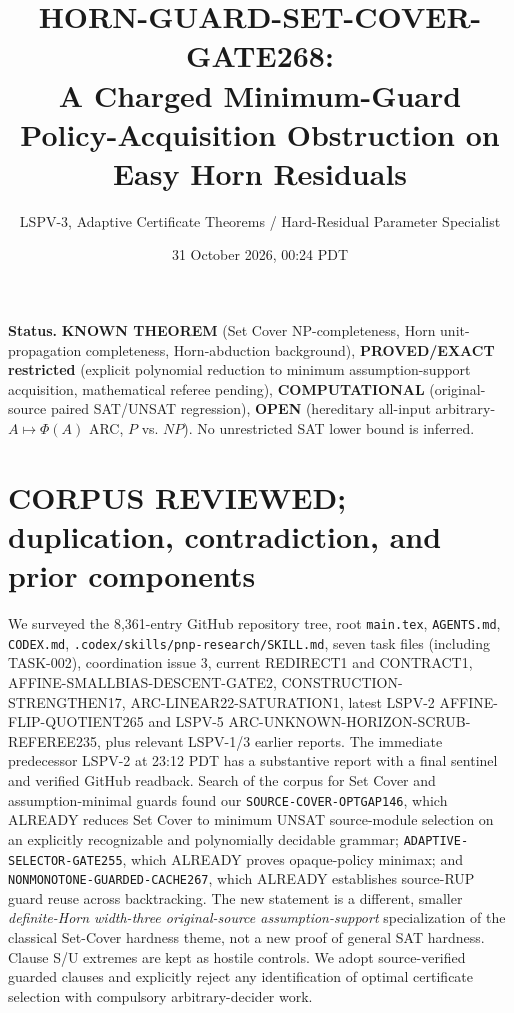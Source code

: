 \documentclass[11pt]{article}
\title{HORN-GUARD-SET-COVER-GATE268:\\A Charged Minimum-Guard Policy-Acquisition Obstruction on Easy Horn Residuals}
\author{LSPV-3, Adaptive Certificate Theorems / Hard-Residual Parameter Specialist}
\date{31 October 2026, 00:24 PDT}
\begin{document}
\maketitle
\noindent\textbf{Status.} \textbf{KNOWN THEOREM} (Set Cover NP-completeness, Horn unit-propagation completeness, Horn-abduction background), \textbf{PROVED/EXACT restricted} (explicit polynomial reduction to minimum assumption-support acquisition, mathematical referee pending), \textbf{COMPUTATIONAL} (original-source paired SAT/UNSAT regression), \textbf{OPEN} (hereditary all-input arbitrary-$A\mapsto\Phi(A)$ ARC, $P$ vs. $NP$). No unrestricted SAT lower bound is inferred.

\section{CORPUS REVIEWED; duplication, contradiction, and prior components}
We surveyed the 8,361-entry GitHub repository tree, root \texttt{main.tex}, \texttt{AGENTS.md}, \texttt{CODEX.md}, \texttt{.codex/skills/pnp-research/SKILL.md}, seven task files (including TASK-002), coordination issue 3, current REDIRECT1 and CONTRACT1, AFFINE-SMALLBIAS-DESCENT-GATE2, CONSTRUCTION-STRENGTHEN17, ARC-LINEAR22-SATURATION1, latest LSPV-2 AFFINE-FLIP-QUOTIENT265 and LSPV-5 ARC-UNKNOWN-HORIZON-SCRUB-REFEREE235, plus relevant LSPV-1/3 earlier reports. The immediate predecessor LSPV-2 at 23:12 PDT has a substantive report with a final sentinel and verified GitHub readback. Search of the corpus for Set Cover and assumption-minimal guards found our \texttt{SOURCE-COVER-OPTGAP146}, which ALREADY reduces Set Cover to minimum UNSAT source-module selection on an explicitly recognizable and polynomially decidable grammar; \texttt{ADAPTIVE-SELECTOR-GATE255}, which ALREADY proves opaque-policy minimax; and \texttt{NONMONOTONE-GUARDED-CACHE267}, which ALREADY establishes source-RUP guard reuse across backtracking. The new statement is a different, smaller \emph{definite-Horn width-three original-source assumption-support} specialization of the classical Set-Cover hardness theme, not a new proof of general SAT hardness. Clause S/U extremes are kept as hostile controls. We adopt source-verified guarded clauses and explicitly reject any identification of optimal certificate selection with compulsory arbitrary-decider work.
\end{document}
